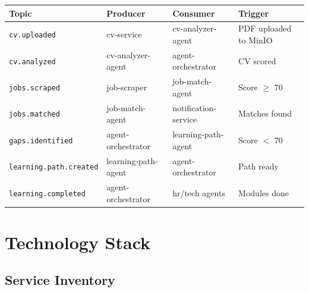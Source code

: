 \documentclass[12pt, a4paper]{report}
\begin{document}
\begin{center}
\begin{tabularx}{\textwidth}{llXl}
\toprule
\rowcolor{primary!20}
\textbf{Topic} & \textbf{Producer} & \textbf{Consumer} & \textbf{Trigger} \\
\midrule
\texttt{cv.uploaded} & cv-service & cv-analyzer-agent & PDF uploaded to MinIO \\
\texttt{cv.analyzed} & cv-analyzer-agent & agent-orchestrator & CV scored \\
\texttt{jobs.scraped} & job-scraper & job-match-agent & Score $\geq$ 70 \\
\texttt{jobs.matched} & job-match-agent & notification-service & Matches found \\
\texttt{gaps.identified} & agent-orchestrator & learning-path-agent & Score $<$ 70 \\
\texttt{learning.path.created} & learning-path-agent & agent-orchestrator & Path ready \\
\texttt{learning.completed} & agent-orchestrator & hr/tech agents & Modules done \\
\bottomrule
\end{tabularx}
\end{center}

\chapter{Technology Stack}

\section{Service Inventory}
\end{document}
